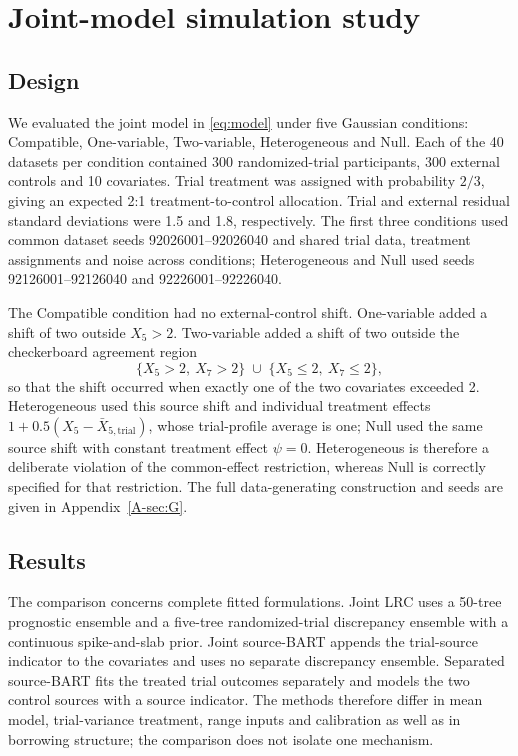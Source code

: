 \section{Joint-model simulation study}
\label{sec:joint_validation_main}

\subsection{Design}

We evaluated the joint model in \eqref{eq:model} under five Gaussian conditions: Compatible, One-variable, Two-variable, Heterogeneous and Null. Each of the 40 datasets per condition contained 300 randomized-trial participants, 300 external controls and 10 covariates. Trial treatment was assigned with probability $2/3$, giving an expected 2:1 treatment-to-control allocation. Trial and external residual standard deviations were 1.5 and 1.8, respectively. The first three conditions used common dataset seeds 92026001--92026040 and shared trial data, treatment assignments and noise across conditions; Heterogeneous and Null used seeds 92126001--92126040 and 92226001--92226040.

The Compatible condition had no external-control shift. One-variable added a shift of two outside $X_5>2$. Two-variable added a shift of two outside the checkerboard agreement region
\[
 \{X_5>2,\ X_7>2\}\;\cup\;\{X_5\leq 2,\ X_7\leq 2\},
\]
so that the shift occurred when exactly one of the two covariates exceeded 2. Heterogeneous used this source shift and individual treatment effects $1+0.5(X_5-\bar X_{5,\mathrm{trial}})$, whose trial-profile average is one; Null used the same source shift with constant treatment effect $\psi=0$. Heterogeneous is therefore a deliberate violation of the common-effect restriction, whereas Null is correctly specified for that restriction. The full data-generating construction and seeds are given in Appendix~\ref{A-sec:G}.

\subsection{Results}

The comparison concerns complete fitted formulations. Joint LRC uses a 50-tree prognostic ensemble and a five-tree randomized-trial discrepancy ensemble with a continuous spike-and-slab prior. Joint source-BART appends the trial-source indicator to the covariates and uses no separate discrepancy ensemble. Separated source-BART fits the treated trial outcomes separately and models the two control sources with a source indicator. The methods therefore differ in mean model, trial-variance treatment, range inputs and calibration as well as in borrowing structure; the comparison does not isolate one mechanism.

